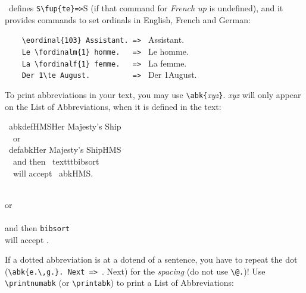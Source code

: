 \documentclass[12pt,a4paper]{article}
\newcommand{\pbs}{\string\ \unskip}
\newcommand{\bs}{\protect\pbs}
\renewcommand{\{}{{\normalfont\lbashortmem}}
\renewcommand{\}}{{\normalfont\rbashortmem}}
\begin{document}
\vspace{2ex}\vfill\noindent 
\BibArts\ defines
\hspace{.1em}\verb|S\fup{te}|\hspace{.3em}\verb|=>|\hspace{.3em}S
(if that command for \textit{French up} is undefined), and it provides
commands to set ordinals in English, French and German:

\vspace{1ex}\vfill\noindent
{\small
  \verb|    \eordinal{103} Assistant. => |  Assistant. \\[-.2ex]
  \verb|    Le \fordinalm{1} homme.   => | Le  homme.   \\[-.25ex]
  \verb|    La \fordinalf{1} femme.   => | La  femme.   \\[-.2ex]
  \verb|    Der 1\te August.          => | Der 1\te August.} 


 \newpage\noindent
 To print abbreviations in your text, you may use 
 \verb|\abk{|\textit{xyz}\verb|}|. \textit{xyz} will only appear 
 on the List of Abbreviations, when it is defined in the text:

 \vspace{-.25ex}
 \Doppelbox
 {
      \bs abkdef\{HMS\}\{Her Majesty\string's Ship\}
   \\[.35ex] \ \ or
   \\[.35ex] \bs defabk\{Her Majesty\string's Ship\}\{HMS\}
   \\[.35ex] \ \ and then \bs texttt\{bibsort\}
   \\[.35ex] \ \ will accept \bs abk\{HMS\}.
   \vspace{-1ex}\strut
 }
 {
   \\  or
   \\ 
   \\  and then \texttt{bibsort}
   \\  will accept .
   \vspace{-1ex}\strut
 }

\noindent 
If a dotted abbreviation is at a dot\hy end of a sentence, you have to
repeat the dot (\verb|\abk{e.\,g.}. Next => |. Next) for the
\textit{spacing} (do not use \verb|\@.|)! Use \verb|\printnumabk| (or
\verb|\printabk|) to print a List of Abbreviations:

\vspace{-.325ex}
\printnumabklist
\end{document}
